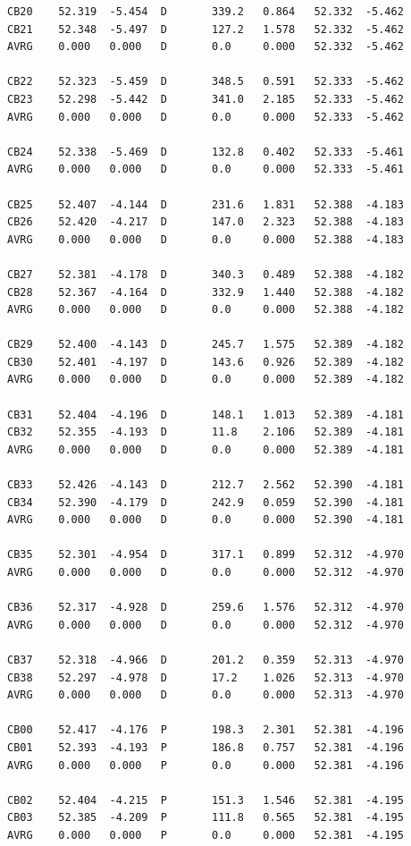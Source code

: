 \documentclass[10pt]{article}
\begin{document}
\begin{verbatim}
CB20    52.319  -5.454  D       339.2   0.864   52.332  -5.462
CB21    52.348  -5.497  D       127.2   1.578   52.332  -5.462
AVRG    0.000   0.000   D       0.0     0.000   52.332  -5.462

CB22    52.323  -5.459  D       348.5   0.591   52.333  -5.462
CB23    52.298  -5.442  D       341.0   2.185   52.333  -5.462
AVRG    0.000   0.000   D       0.0     0.000   52.333  -5.462

CB24    52.338  -5.469  D       132.8   0.402   52.333  -5.461
AVRG    0.000   0.000   D       0.0     0.000   52.333  -5.461

CB25    52.407  -4.144  D       231.6   1.831   52.388  -4.183
CB26    52.420  -4.217  D       147.0   2.323   52.388  -4.183
AVRG    0.000   0.000   D       0.0     0.000   52.388  -4.183

CB27    52.381  -4.178  D       340.3   0.489   52.388  -4.182
CB28    52.367  -4.164  D       332.9   1.440   52.388  -4.182
AVRG    0.000   0.000   D       0.0     0.000   52.388  -4.182

CB29    52.400  -4.143  D       245.7   1.575   52.389  -4.182
CB30    52.401  -4.197  D       143.6   0.926   52.389  -4.182
AVRG    0.000   0.000   D       0.0     0.000   52.389  -4.182

CB31    52.404  -4.196  D       148.1   1.013   52.389  -4.181
CB32    52.355  -4.193  D       11.8    2.106   52.389  -4.181
AVRG    0.000   0.000   D       0.0     0.000   52.389  -4.181

CB33    52.426  -4.143  D       212.7   2.562   52.390  -4.181
CB34    52.390  -4.179  D       242.9   0.059   52.390  -4.181
AVRG    0.000   0.000   D       0.0     0.000   52.390  -4.181

CB35    52.301  -4.954  D       317.1   0.899   52.312  -4.970
AVRG    0.000   0.000   D       0.0     0.000   52.312  -4.970

CB36    52.317  -4.928  D       259.6   1.576   52.312  -4.970
AVRG    0.000   0.000   D       0.0     0.000   52.312  -4.970

CB37    52.318  -4.966  D       201.2   0.359   52.313  -4.970
CB38    52.297  -4.978  D       17.2    1.026   52.313  -4.970
AVRG    0.000   0.000   D       0.0     0.000   52.313  -4.970

CB00    52.417  -4.176  P       198.3   2.301   52.381  -4.196
CB01    52.393  -4.193  P       186.8   0.757   52.381  -4.196
AVRG    0.000   0.000   P       0.0     0.000   52.381  -4.196

CB02    52.404  -4.215  P       151.3   1.546   52.381  -4.195
CB03    52.385  -4.209  P       111.8   0.565   52.381  -4.195
AVRG    0.000   0.000   P       0.0     0.000   52.381  -4.195


\end{verbatim}
\end{document}
